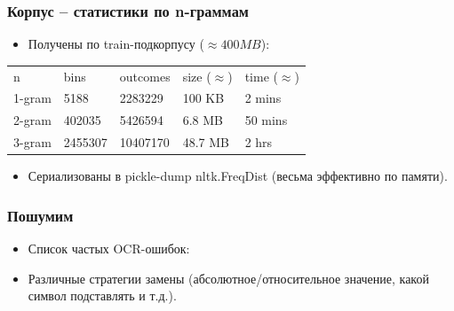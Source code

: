 \documentclass[14pt]{beamer}
\begin{document}
\begin{frame}
\frametitle{Корпус -- статистики по n-граммам}
\begin{itemize}
  \item Получены по train-подкорпусу ($\approx 400MB$):
\end{itemize}
\begin{center}
\begin{tabular}{lllll}
n & bins & outcomes & size ($\approx$) & time ($\approx$) \\
1-gram & 5188 & 2283229 & 100 KB & 2 mins \\
2-gram & 402035 & 5426594 & 6.8 MB & 50 mins \\
3-gram & 2455307 & 10407170 & 48.7 MB & 2 hrs
\end{tabular}
\end{center}
\begin{itemize}
  \item Сериализованы в pickle-dump nltk.FreqDist (весьма эффективно по памяти).
\end{itemize}
\end{frame}


\begin{frame}
\frametitle{Пошумим}
\begin{itemize}
    \item Список частых OCR-ошибок:
\end{itemize}
\begin{itemize}
    \item Различные стратегии замены (абсолютное/относительное значение, какой символ подставлять и т.д.).
\end{itemize}
\end{frame}
\end{document}

